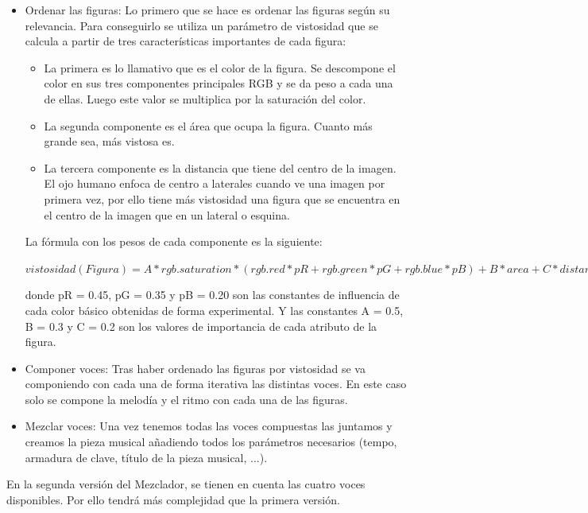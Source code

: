 \begin{itemize}
	\item Ordenar las figuras: Lo primero que se hace es ordenar las figuras según su relevancia. Para conseguirlo se utiliza un parámetro de vistosidad que se calcula a partir de tres características importantes de cada figura:
	\begin{itemize}
		\item La primera es lo llamativo que es el color de la figura. Se descompone el color en sus tres componentes principales RGB y se da peso a cada una de ellas. Luego este valor se multiplica por la saturación del color.
		\item La segunda componente es el área que ocupa la figura. Cuanto más grande sea, más vistosa es.
		\item La tercera componente es la distancia que tiene del centro de la imagen. El ojo humano enfoca de centro a laterales cuando ve una imagen por primera vez, por ello tiene más vistosidad una figura que se encuentra en el centro de la imagen que en un lateral o esquina.
	\end{itemize}
	
\color{blue}
	La fórmula con los pesos de cada componente es la siguiente:
	\begin{center}
		$vistosidad(Figura) =
		A*rgb.saturation * (rgb.red*pR + rgb.green*pG + rgb.blue*pB)
		 + B*area + C*distanceCenter
		$
	\end{center}

donde pR = 0.45, pG = 0.35 y pB = 0.20 son las constantes de influencia de cada color básico obtenidas de forma experimental. Y las constantes A = 0.5, B = 0.3 y C = 0.2 son los valores de importancia de cada atributo de la figura.
\color{black}

	\item Componer voces: Tras haber ordenado las figuras por vistosidad se va componiendo con cada una de forma iterativa las distintas voces. En este caso solo se compone la melodía y el ritmo con cada una de las figuras.

	\item Mezclar voces: Una vez tenemos todas las voces compuestas las juntamos y creamos la pieza musical añadiendo todos los parámetros necesarios (tempo, armadura de clave, título de la pieza musical, ...).

\end{itemize}

En la segunda versión del Mezclador, se tienen en cuenta las cuatro voces disponibles. Por ello tendrá más complejidad que la primera versión.

